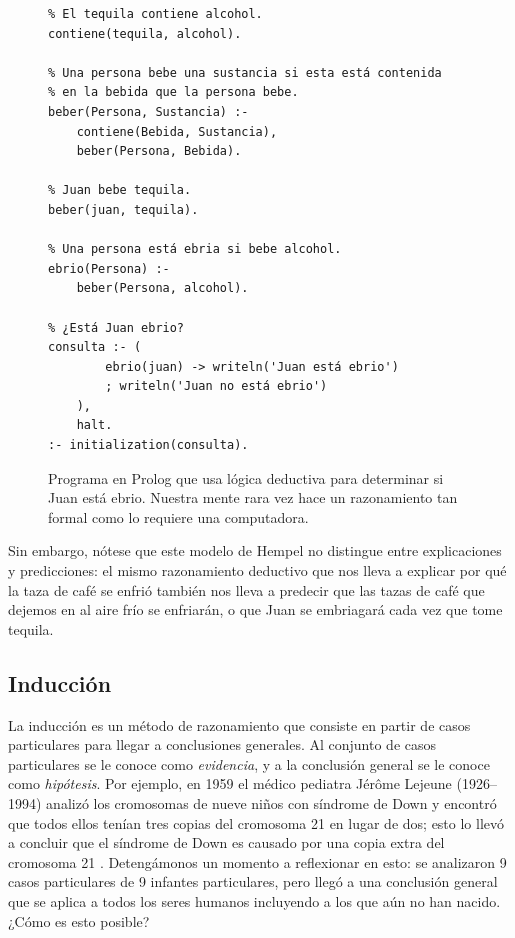 \begin{figure}
    \centering
    \begin{verbatim}
% El tequila contiene alcohol.
contiene(tequila, alcohol).

% Una persona bebe una sustancia si esta está contenida
% en la bebida que la persona bebe.
beber(Persona, Sustancia) :-
    contiene(Bebida, Sustancia),
    beber(Persona, Bebida).

% Juan bebe tequila.
beber(juan, tequila).

% Una persona está ebria si bebe alcohol.
ebrio(Persona) :-
    beber(Persona, alcohol).

% ¿Está Juan ebrio?
consulta :- (
        ebrio(juan) -> writeln('Juan está ebrio')
        ; writeln('Juan no está ebrio')
    ),
    halt.
:- initialization(consulta).
\end{verbatim}
    \caption{Programa en Prolog que usa lógica deductiva para determinar si
        Juan está ebrio.
        Nuestra mente rara vez hace un razonamiento tan formal como lo requiere
        una computadora.}
\end{figure}

Sin embargo, nótese que este modelo de Hempel no distingue entre explicaciones y
predicciones: el mismo razonamiento deductivo que nos lleva a explicar por qué
la taza de café se enfrió también nos lleva a predecir que las tazas de café que
dejemos en al aire frío se enfriarán, o que Juan se embriagará cada vez que
tome tequila.

\subsection*{Inducción}
\label{sub:induccion}
La inducción es un método de razonamiento que consiste en partir de casos
particulares para llegar a conclusiones generales.
Al conjunto de casos particulares se le conoce como \emph{evidencia}, y a la
conclusión general se le conoce como \emph{hipótesis}.
Por ejemplo, en 1959 el médico pediatra Jérôme Lejeune (1926--1994) analizó los
cromosomas de nueve niños con síndrome de Down y encontró que todos ellos tenían
tres copias del cromosoma 21 en lugar de dos; esto lo llevó a concluir que el
síndrome de Down es causado por una copia extra del cromosoma 21%
\cite{Lejeune1959}.
Detengámonos un momento a reflexionar en esto: se analizaron 9 casos
particulares de 9 infantes particulares, pero llegó a una conclusión general que
se aplica a todos los seres humanos incluyendo a los que aún no han nacido.
¿Cómo es esto posible?

